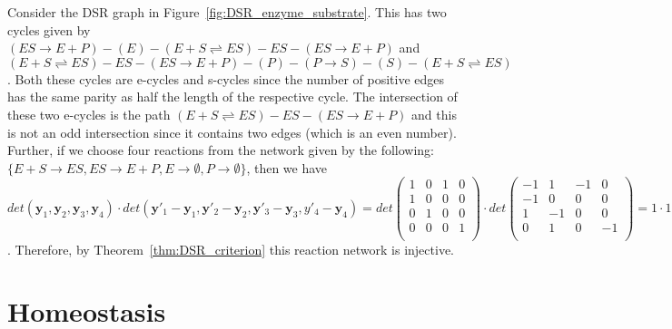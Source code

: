 \documentclass[11pt]{article}
\theoremstyle{plain}
\theoremstyle{definition}
\theoremstyle{remark}
\newcommand\y{\boldsymbol{y}}
\begin{document}
Consider the DSR graph in Figure~\ref{fig:DSR_enzyme_substrate}. This has two cycles given by $(ES\rightarrow E+P)-(E)-(E+S\rightleftharpoons ES)-ES-(ES\rightarrow E+P)$ and $(E+S\rightleftharpoons ES)-ES-(ES\rightarrow E+P)-(P)-(P\rightarrow S)-(S)-(E+S\rightleftharpoons ES)$. Both these cycles are e-cycles and s-cycles since the number of positive edges has the same parity as half the length of the respective cycle. The intersection of these two e-cycles is the path $(E+S\rightleftharpoons ES)-ES-(ES\rightarrow E+P)$ and this is not an odd intersection since it contains two edges (which is an even number). Further, 
if we choose four reactions from the network given by the following: $\{E + S \rightarrow ES, ES \rightarrow E + P, E\rightarrow  \emptyset, P \rightarrow \emptyset\}$, then we have $det(\y_1,\y_2,\y_3,\y_4)\cdot det(\y'_1-\y_1,\y'_2-\y_2,\y'_3-\y_3,y'_4-\y_4) = det \begin{pmatrix} 
1  &  0  &  1  & 0 \\
1  &  0  &  0  & 0 \\
0  &  1  &  0  & 0 \\
0  &  0  &  0  & 1 \\
\end{pmatrix}\cdot
det\begin{pmatrix} 
-1  &  1  &  -1  & 0 \\
-1 &   0  &  0  & 0 \\
1  &  -1  &  0  & 0 \\
0  &   1  &  0  & -1 \\
\end{pmatrix}=1\cdot 1\neq 0$. Therefore, by Theorem~\ref{thm:DSR_criterion} this reaction network is injective.



\section{Homeostasis}\label{sec:local_homeostasis}
\end{document}
